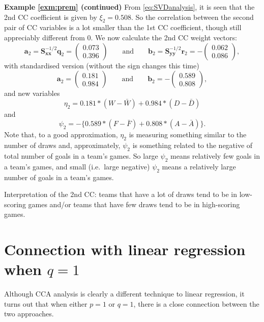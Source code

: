 \documentclass[]{book}
\theoremstyle{definition}
\theoremstyle{definition}
\theoremstyle{definition}
\theoremstyle{remark}
\begin{document}
\textbf{Example \ref{exm:prem} (continued)} From \eqref{eq:SVDanalysis}, it is seen that the 2nd CC coefficient is given by \(\xi_2=0.508\). So the correlation between the second pair of CC variables is a lot smaller than the 1st CC coefficient, though still appreciably different from \(0\). We now calculate the 2nd CC weight vectors:
\[
\boldsymbol a_2=\boldsymbol S_{\boldsymbol x\boldsymbol x}^{-1/2} \boldsymbol q_2 = \begin{pmatrix} 0.073 \\ 0.396 \end{pmatrix}
\qquad \text{and} \qquad
\boldsymbol b_2=\boldsymbol S_{\boldsymbol y\boldsymbol y}^{-1/2}\boldsymbol r_2=-\begin{pmatrix}0.062\\ 0.086  \end{pmatrix},
\]
with standardised version (without the sign changes this time)
\[
\boldsymbol a_2=\begin{pmatrix}0.181 \\ 0.984  \end{pmatrix}
\qquad \text{and} \qquad
\boldsymbol b_2=-\begin{pmatrix}0.589 \\ 0.808  \end{pmatrix},
\]
and new variables
\[
\eta_2=0.181*(W-\bar{W}) +0.984*(D -\bar{D})
\]
and
\[
\psi_2=-\{0.589*(F-\bar{F})+0.808*(A-\bar{A})\}.
\]
Note that, to a good approximation, \(\eta_2\) is measuring something similar to the number of draws and, approximately, \(\psi_2\) is something related to the negative of total number of goals in a team's games. So large \(\psi_2\) means relatively few goals in a team's games, and small (i.e.~large negative) \(\psi_2\) means a relatively large number of goals in a team's games.

Interpretation of the 2nd CC: teams that have a lot of draws tend to be in low-scoring games and/or teams that have few draws tend to be in high-scoring games.

\hypertarget{connection-with-linear-regression-when-q1}{%
\section{\texorpdfstring{Connection with linear regression when \(q=1\)}{Connection with linear regression when q=1}}\label{connection-with-linear-regression-when-q1}}

Although CCA analysis is clearly a different technique to linear regression, it turns out that when either \(p=1\) or \(q=1\), there is a close connection between the two approaches.
\end{document}

